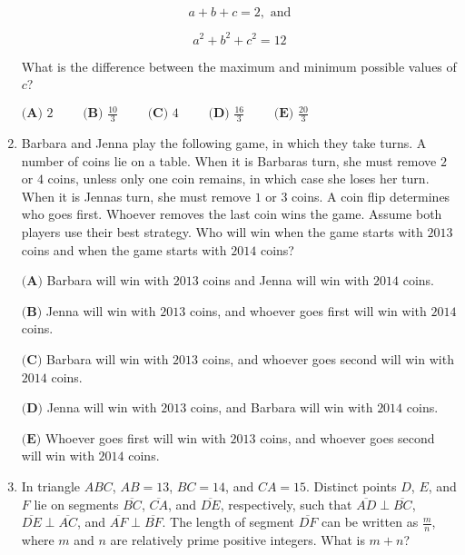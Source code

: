 \documentclass{article}
\begin{document}
\begin{enumerate}[label=\arabic*., itemsep=0.5em]
\begin{equation*}
a+b+c=2, \text{ and}
\end{equation*}


\begin{equation*}
a^2+b^2+c^2=12
\end{equation*}


What is the difference between the maximum and minimum possible values of \(c\)?

\( \textbf{(A) }2\qquad \textbf{ (B) }\frac{10}{3}\qquad \textbf{ (C) }4 \qquad \textbf{ (D) }\frac{16}{3}\qquad \textbf{ (E) }\frac{20}{3} \)\par \vspace{0.5em}\item Barbara and Jenna play the following game, in which they take turns. A number of coins lie on a table. When it is Barbaras turn, she must remove \(2\) or \(4\) coins, unless only one coin remains, in which case she loses her turn. When it is Jennas turn, she must remove \(1\) or \(3\) coins. A coin flip determines who goes first. Whoever removes the last coin wins the game. Assume both players use their best strategy. Who will win when the game starts with \(2013\) coins and when the game starts with \(2014\) coins?

\( \textbf{(A)}\) Barbara will win with \(2013\) coins and Jenna will win with \(2014\) coins. 

\(\textbf{(B)}\) Jenna will win with \(2013\) coins, and whoever goes first will win with \(2014\) coins. 

\(\textbf{(C)}\) Barbara will win with \(2013\) coins, and whoever goes second will win with \(2014\) coins.

\(\textbf{(D)}\) Jenna will win with \(2013\) coins, and Barbara will win with \(2014\) coins.

\(\textbf{(E)}\) Whoever goes first will win with \(2013\) coins, and whoever goes second will win with \(2014\) coins.\par \vspace{0.5em}\item In triangle \(ABC\), \(AB=13\), \(BC=14\), and \(CA=15\). Distinct points \(D\), \(E\), and \(F\) lie on segments \(\overline{BC}\), \(\overline{CA}\), and \(\overline{DE}\), respectively, such that \(\overline{AD}\perp\overline{BC}\), \(\overline{DE}\perp\overline{AC}\), and \(\overline{AF}\perp\overline{BF}\). The length of segment \(\overline{DF}\) can be written as \(\frac{m}{n}\), where \(m\) and \(n\) are relatively prime positive integers. What is \(m+n\)?


\end{enumerate}
\end{document}
